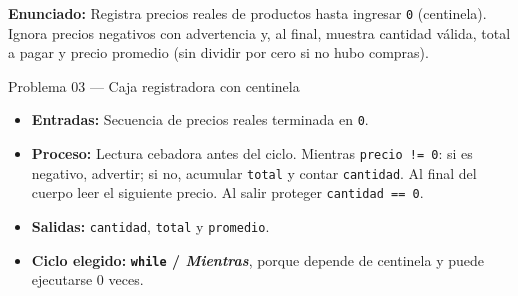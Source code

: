 \documentclass[11pt,letterpaper]{article}
\begin{document}
\textbf{Enunciado:} Registra precios reales de productos hasta ingresar \texttt{0} (centinela). Ignora precios negativos con advertencia y, al final, muestra cantidad válida, total a pagar y precio promedio (sin dividir por cero si no hubo compras).

\begin{analisis}{Problema 03 --- Caja registradora con centinela}
\begin{itemize}
  \item \textbf{Entradas:} Secuencia de precios reales terminada en \texttt{0}.
  \item \textbf{Proceso:} Lectura cebadora antes del ciclo. Mientras \texttt{precio != 0}: si es negativo, advertir; si no, acumular \texttt{total} y contar \texttt{cantidad}. Al final del cuerpo leer el siguiente precio. Al salir proteger \texttt{cantidad == 0}.
  \item \textbf{Salidas:} \texttt{cantidad}, \texttt{total} y \texttt{promedio}.
  \item \textbf{Ciclo elegido:} \textbf{\texttt{while} / \textit{Mientras}}, porque depende de centinela y puede ejecutarse 0 veces.
\end{itemize}
\end{analisis}





\end{document}
